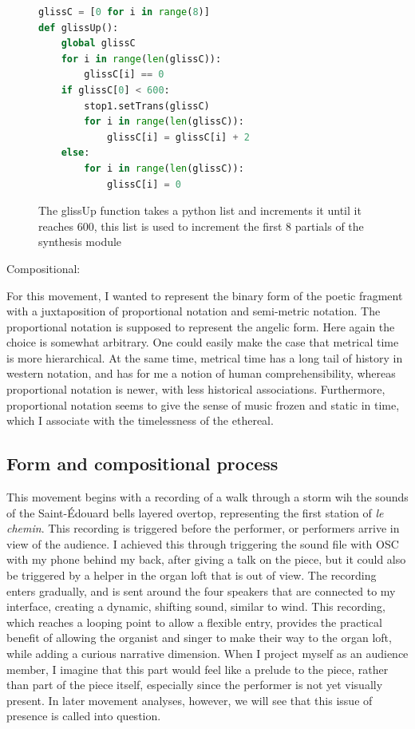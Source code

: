 \documentclass[12pt,twoside,maitrise]{dms_ks}
\theoremstyle{definition}
\begin{document}
{\begin{figure}[H]
\begin{lstlisting}[language=Python]
glissC = [0 for i in range(8)]
def glissUp():
    global glissC
    for i in range(len(glissC)):
        glissC[i] == 0
    if glissC[0] < 600:
        stop1.setTrans(glissC)
        for i in range(len(glissC)):
            glissC[i] = glissC[i] + 2
    else:
        for i in range(len(glissC)):
            glissC[i] = 0
\end{lstlisting}
\caption{The glissUp function takes a python list and increments it until it reaches 600, this list is used to increment the first 8 partials of the synthesis module}
\end{figure}

Compositional:

For this movement, I wanted to represent the binary form of the poetic fragment with a juxtaposition of proportional notation and semi-metric notation.
The proportional notation is supposed to represent the angelic form.
Here again the choice is somewhat arbitrary.
One could easily make the case that metrical time is more hierarchical.
At the same time, metrical time has a long tail of history in western notation, and has for me a notion of human comprehensibility, whereas proportional notation is newer, with less historical associations.
Furthermore, proportional notation seems to give the sense of music frozen and static in time, which I associate with the timelessness of the ethereal.

\subsection{Form and compositional process}

This movement begins with a recording of a walk through a storm wih the sounds of the Saint-Édouard bells layered overtop, representing the first station of \textit{le chemin}.
This recording is triggered before the performer, or performers arrive in view of the audience.
I achieved this through triggering the sound file with OSC with my phone behind my back, after giving a talk on the piece, but it could also be triggered by a helper in the organ loft that is out of view.
The recording enters gradually, and is sent around the four speakers that are connected to my interface, creating a dynamic, shifting sound, similar to wind.
This recording, which reaches a looping point to allow a flexible entry, provides the practical benefit of allowing the organist and singer to make their way to the organ loft, while adding a curious narrative dimension.
When I project myself as an audience member, I imagine that this part would feel like a prelude to the piece, rather than part of the piece itself, especially since the performer is not yet visually present.
In later movement analyses, however, we will see that this issue of presence is called into question.

}
\end{document}
